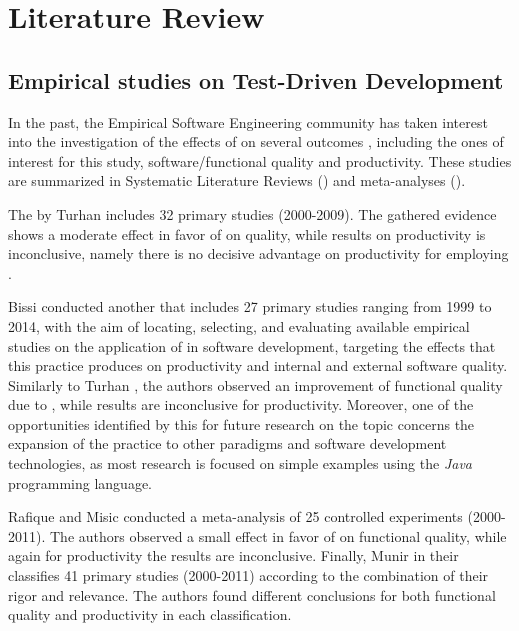 \chapter{Literature Review}
\label{chap:4_literature}
\section{Empirical studies on Test-Driven Development}
In the past, the Empirical Software Engineering community has taken interest into the investigation of the effects of \tdd on several outcomes \cite{DBLP:conf/esem/FucciS0SSUTJO16} \cite{DBLP:journals/tse/ErdogmusMT05} \cite{DBLP:journals/infsof/Madeyski10}, including the ones of interest for this study, \ie software/functional quality and productivity. These studies are summarized in Systematic Literature Reviews (\slrs) and meta-analyses (\eg \cite{DBLP:journals/infsof/BissiNE16, DBLP:journals/infsof/MunirMP14, DBLP:journals/tse/RafiqueM13, TDDEffective}).

The \slr by Turhan \etal \cite{TDDEffective} includes 32 primary studies (2000-2009). The gathered evidence shows a moderate effect in favor of \tdd on quality, while results on productivity is inconclusive, namely there is no decisive advantage on productivity for employing \tdd. 

Bissi \etal \cite{DBLP:journals/infsof/BissiNE16} conducted another \slr that includes 27 primary studies ranging from 1999 to 2014, with the aim of locating, selecting, and evaluating available empirical studies on the application of \tdd in software development, targeting the effects that this practice produces on productivity and internal and external software quality. Similarly to Turhan \etal \cite{TDDEffective}, the authors observed an improvement of functional quality due to \tdd, while results are inconclusive for productivity. Moreover, one of the opportunities identified by this \slr for future research on the topic concerns the expansion of the \tdd practice to other paradigms and software development technologies, as most research is focused on simple examples using the \textit{Java} programming language.

Rafique and Misic \cite{DBLP:journals/tse/RafiqueM13} conducted a meta-analysis of 25 controlled experiments (2000-2011). The authors observed a small effect in favor of \tdd on functional quality, while again for productivity the results are inconclusive. 
Finally, Munir \etal \cite{DBLP:journals/infsof/MunirMP14,} in their \slr classifies 41 primary studies (2000-2011) according to the combination of their rigor and relevance. The authors found different conclusions for both functional quality and productivity in each classification.

